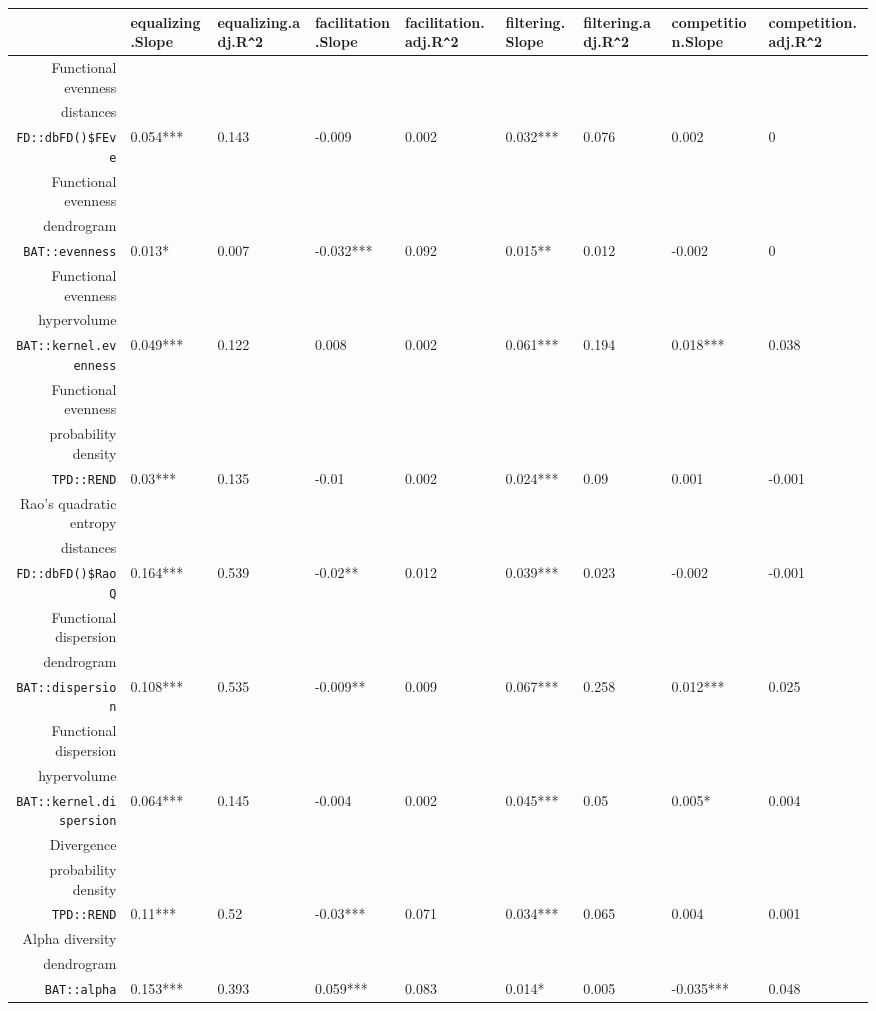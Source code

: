 \begin{table}[ht]
\scriptsize
\centering
\begin{tabular}{rllllllll}
  \hline
 & equalizing.Slope & equalizing.adj.R\verb|^|2 & facilitation.Slope & facilitation.adj.R\verb|^|2 & filtering.Slope & filtering.adj.R\verb|^|2 & competition.Slope & competition.adj.R\verb|^|2 \\ 
  \hline
Functional evenness\\distances\\\texttt{FD::dbFD()\$FEve} & 0.054*** & 0.143 & -0.009 & 0.002 & 0.032*** & 0.076 & 0.002 & 0 \\ 
  Functional evenness\\dendrogram\\\texttt{BAT::evenness} & 0.013* & 0.007 & -0.032*** & 0.092 & 0.015** & 0.012 & -0.002 & 0 \\ 
  Functional evenness\\hypervolume\\\texttt{BAT::kernel.evenness} & 0.049*** & 0.122 & 0.008 & 0.002 & 0.061*** & 0.194 & 0.018*** & 0.038 \\ 
  Functional evenness\\probability density\\\texttt{TPD::REND} & 0.03*** & 0.135 & -0.01 & 0.002 & 0.024*** & 0.09 & 0.001 & -0.001 \\ 
  Rao's quadratic entropy\\distances\\\texttt{FD::dbFD()\$RaoQ} & 0.164*** & 0.539 & -0.02** & 0.012 & 0.039*** & 0.023 & -0.002 & -0.001 \\ 
  Functional dispersion\\dendrogram\\\texttt{BAT::dispersion} & 0.108*** & 0.535 & -0.009** & 0.009 & 0.067*** & 0.258 & 0.012*** & 0.025 \\ 
  Functional dispersion\\hypervolume\\\texttt{BAT::kernel.dispersion} & 0.064*** & 0.145 & -0.004 & 0.002 & 0.045*** & 0.05 & 0.005* & 0.004 \\ 
  Divergence\\probability density\\\texttt{TPD::REND} & 0.11*** & 0.52 & -0.03*** & 0.071 & 0.034*** & 0.065 & 0.004 & 0.001 \\ 
  Alpha diversity\\dendrogram\\\texttt{BAT::alpha} & 0.153*** & 0.393 & 0.059*** & 0.083 & 0.014* & 0.005 & -0.035*** & 0.048 \\ 

\end{tabular}
\end{table}
